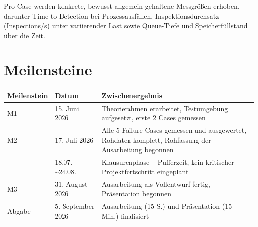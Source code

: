 Pro Case werden konkrete, bewusst allgemein gehaltene Messgrößen erhoben, darunter
Time-to-Detection bei Prozessausfällen, Inspektionsdurchsatz (Inspections/s) unter
variierender Last sowie Queue-Tiefe und Speicherfüllstand über die Zeit.

\section{Meilensteine}

\begin{table}[h]
    \centering
    \renewcommand{\arraystretch}{1.2}
    \begin{tabularx}{\textwidth}{|l|l|X|}
        \hline
        \textbf{Meilenstein} & \textbf{Datum} & \textbf{Zwischenergebnis} \\ \hline
        M1 & 15. Juni 2026 & Theorierahmen erarbeitet, Testumgebung aufgesetzt, erste 2 Cases gemessen \\ \hline
        M2 & 17. Juli 2026 & Alle 5 Failure Cases gemessen und ausgewertet, Rohdaten komplett, Rohfassung der Ausarbeitung begonnen \\ \hline
        -- & 18.07. -- \textasciitilde24.08. & Klausurenphase -- Pufferzeit, kein kritischer Projektfortschritt eingeplant \\ \hline
        M3 & 31. August 2026 & Ausarbeitung als Vollentwurf fertig, Präsentation begonnen \\ \hline
        Abgabe & 5. September 2026 & Ausarbeitung (15 S.) und Präsentation (15 Min.) finalisiert \\ \hline
    \end{tabularx}
\end{table}
